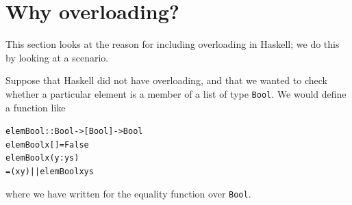 \section{Why overloading?}
\label{whyOver}

This section looks at the reason for including overloading in Haskell;
we do this by looking at a scenario.

Suppose that Haskell did not have overloading, and that we wanted to
check whether a particular element is a member of a list of type
\texttt{Bool}. We would define a function like
\begin{alltt}
elemBool :: Bool -> [Bool] -> Bool
elemBool x [] = False
elemBool x (y:ys)
  = (x  y) || elemBool x ys
\end{alltt}
where we have written \texttt{} for the equality 
function over \texttt{Bool}. 

